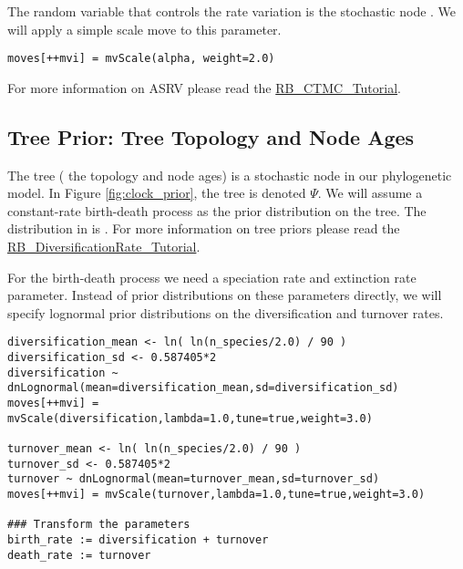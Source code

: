 The random variable that controls the rate variation is the stochastic node . 
We will apply a simple scale move to this parameter.
{\tt \begin{snugshade*}
\begin{lstlisting}
moves[++mvi] = mvScale(alpha, weight=2.0)
\end{lstlisting}
\end{snugshade*}}

For more information on ASRV please read the \href{https://github.com/revbayes/revbayes_tutorial/raw/master/tutorial_TeX/RB_CTMC_Tutorial/RB_CTMC_Tutorial.pdf}{RB\_CTMC\_Tutorial}.



\subsection{Tree Prior: Tree Topology and Node Ages}

The tree ( the topology and node ages) is a stochastic node in our phylogenetic model. 
In Figure \ref{fig:clock_prior}, the tree is denoted $\Psi$.
We will assume a constant-rate birth-death process as the prior distribution on the tree.
The distribution in \RevBayes is . 
For more information on tree priors please read the \href{https://github.com/revbayes/revbayes_tutorial/raw/master/tutorial_TeX/RB_DiversificationRate_Tutorial/RB_Diversification_Tutorial.pdf}{RB\_DiversificationRate\_Tutorial}.

For the birth-death process we need a speciation rate and extinction rate parameter.
Instead of prior distributions on these parameters directly, we will specify lognormal prior distributions on the diversification and turnover rates.
{\tt \begin{snugshade*}
\begin{lstlisting}
diversification_mean <- ln( ln(n_species/2.0) / 90 )
diversification_sd <- 0.587405*2
diversification ~ dnLognormal(mean=diversification_mean,sd=diversification_sd) 
moves[++mvi] = mvScale(diversification,lambda=1.0,tune=true,weight=3.0)

turnover_mean <- ln( ln(n_species/2.0) / 90 )
turnover_sd <- 0.587405*2
turnover ~ dnLognormal(mean=turnover_mean,sd=turnover_sd) 
moves[++mvi] = mvScale(turnover,lambda=1.0,tune=true,weight=3.0)

### Transform the parameters
birth_rate := diversification + turnover
death_rate := turnover
\end{lstlisting}
\end{snugshade*}}

